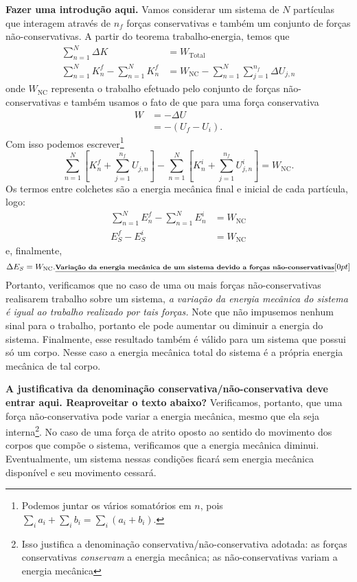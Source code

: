 \textbf{Fazer uma introdução aqui.}
Vamos considerar um sistema de $N$ partículas que interagem através de $n_f$ forças conservativas e também um conjunto de forças não-conservativas. A partir do teorema trabalho-energia, temos que
\begin{align}
    \sum_{n=1}^N \Delta K &= W_{\textrm{Total}} \\
    \sum_{n=1}^N K_n^f - \sum_{n=1}^N K_n^f &= W_{\textrm{NC}} - \sum_{n = 1}^N \sum_{j = 1}^{n_f} \Delta U_{j,n}
\end{align}
%
onde $W_{\textrm{NC}}$ representa o trabalho efetuado pelo conjunto de forças não-conservativas e também usamos o fato de que para uma força conservativa
\begin{align}
    W &= - \Delta U \\
    &= -(U_f - U_i).
\end{align}
%
Com isso podemos escrever\footnote{Podemos juntar os vários somatórios em $n$, pois $\sum_i a_i + \sum_i b_i = \sum_i(a_i + b_i)$.}
\begin{equation}
    \sum_{n=1}^N[ K_n^f + \sum_{j = 1}^{n_f} U_{j,n}] - \sum_{n=1}^N[K_n^i + \sum_{j = 1}^{n_f} U_{j,n}^i] = W_{\textrm{NC}}.
\end{equation}
%
Os termos entre colchetes são a energia mecânica final e inicial de cada partícula, logo:
\begin{align}
    \sum_{n=1}^N E_n^f - \sum_{n=1}^N E_n^i &= W_{\textrm{NC}} \\
    E_{S}^f - E_S^i &= W_{\textrm{NC}}
\end{align}
%
e, finalmente,
\begin{equation}\label{Eq:TrabalhoNCIgualVarEnergiaMec}
    \Delta E_S = W_{\textrm{NC}}. \relax{\footnotesize\emph{\textbf{Variação da energia mecânica de um sistema devido a forças não-conservativas}}}[0pt]
\end{equation}
%
Portanto, verificamos que no caso de uma ou mais forças não-conservativas realisarem trabalho sobre um sistema, \emph{a variação da energia mecânica do sistema é igual ao trabalho realizado por tais forças.} Note que não impusemos nenhum sinal para o trabalho, portanto ele pode aumentar ou diminuir a energia do sistema. Finalmente, esse resultado também é válido para um sistema que possui só um corpo. Nesse caso a energia mecânica total do sistema é a própria energia mecânica de tal corpo. 

\textbf{A justificativa da denominação conservativa/não-conservativa deve entrar aqui. Reaproveitar o texto abaixo?}
Verificamos, portanto, que uma força não-conservativa pode variar a energia mecânica, mesmo que ela seja interna\footnote{Isso justifica a denominação conservativa/não-conservativa adotada: as forças conservativas \emph{conservam} a energia mecânica; as não-conservativas variam a energia mecânica}. No caso de uma força de atrito oposto ao sentido do movimento dos corpos que compõe o sistema, verificamos que a energia mecânica diminui. Eventualmente, um sistema nessas condições ficará sem energia mecânica disponível e seu movimento cessará.

